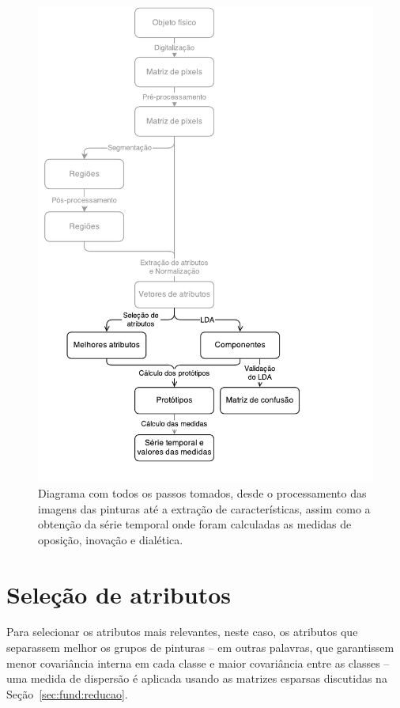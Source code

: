 \begin{figure}[ht!]
\begin{center} 
          \caption{Diagrama com todos os passos tomados, desde o processamento das
        imagens das pinturas até a extração de características, assim como a
        obtenção da série temporal onde foram calculadas as medidas de oposição,
        inovação e dialética.}
        \label{fig:dataflow}
        \includegraphics[scale=.8]{figs/dataflow_pintores3}
        \fonteminha
\end{center}
\end{figure}

\section{Seleção de atributos}

Para selecionar os atributos mais relevantes, neste caso, os atributos que
separassem melhor os grupos de pinturas -- em outras palavras, que garantissem
menor covariância interna em cada classe e maior covariância entre as classes --
uma medida de dispersão é aplicada usando as matrizes esparsas discutidas na
Seção~\ref{sec:fund:reducao}.

